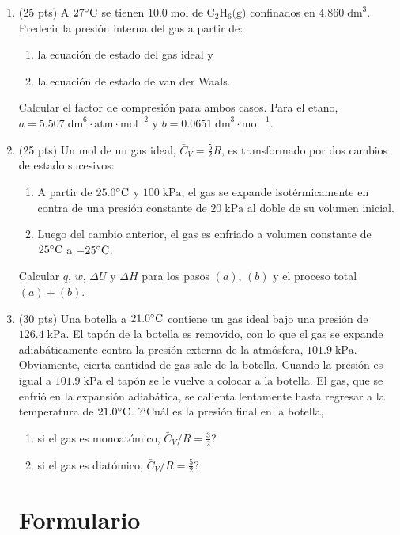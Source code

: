 \documentclass[a4paper,12pt]{article}
\begin{document}
\begin{enumerate}
 \item (25 pts) A $27\celsius$ se tienen $10.0\;\mbox{mol}$ de $\mbox{C}_2\mbox{H}_6\mbox{(g)}$ confinados en $4.860\;\mbox{dm}^3$. Predecir la presi\'on interna del gas a partir de:
 \begin{enumerate}
  \item la ecuaci\'on de estado del gas ideal y
  \item la ecuaci\'on de estado de van der Waals.
 \end{enumerate}
Calcular el factor de compresi\'on para ambos casos. Para el etano, $a=5.507\;\mbox{dm}^6\cdot\mbox{atm}\cdot\mbox{mol}^{-2}$ y $b=0.0651\;\mbox{dm}^{3}\cdot\mbox{mol}^{-1}$.

\newpage

 \item (25 pts) Un mol de un gas ideal, $\bar{C}_V=\frac{5}{2}R$, es transformado por dos cambios de estado sucesivos:
 \begin{enumerate}
  \item A partir de $25.0\celsius$ y $100\;\mbox{kPa}$, el gas se expande isot\'ermicamente en contra de una presi\'on constante de $20\;\mbox{kPa}$ al doble de su volumen inicial.
  \item Luego del cambio anterior, el gas es enfriado a volumen constante de $25\celsius$ a $-25\celsius$.
 \end{enumerate}
Calcular $q$, $w$, $\Delta U$ y $\Delta H$ para los pasos $(a)$, $(b)$ y el proceso total $(a)+(b)$.

 \item (30 pts) Una botella a $21.0\celsius$ contiene un gas ideal bajo una presi\'on de $126.4\;\mbox{kPa}$. El tap\'on de la botella es removido, con lo que el gas se expande adiab\'aticamente contra la presi\'on externa de la atm\'osfera, $101.9\;\mbox{kPa}$. Obviamente, cierta cantidad de gas sale de la botella. Cuando la presi\'on es igual a $101.9\;\mbox{kPa}$ el tap\'on se le vuelve a colocar a la botella. El gas, que se enfri\'o en la expansi\'on adiab\'atica, se calienta lentamente hasta regresar a la temperatura de $21.0\celsius$. ?`Cu\'al es la presi\'on final en la botella,
 \begin{enumerate}
  \item si el gas es monoat\'omico, $\bar{C}_V/R=\frac{3}{2}$?
  \item si el gas es diat\'omico, $\bar{C}_V/R=\frac{5}{2}$?
 \end{enumerate}

\section*{Formulario}


\end{enumerate}
\end{document}
